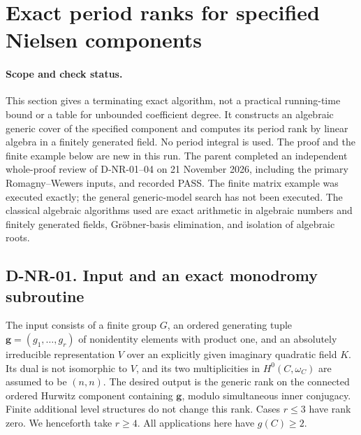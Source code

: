 \section{Exact period ranks for specified Nielsen components}
\label{sec:nielsen-rank-algorithm}

\paragraph{Scope and check status.}
This section gives a terminating exact algorithm, not a practical running-time
bound or a table for unbounded coefficient degree.  It constructs an algebraic
generic cover of the specified component and computes its period rank by
linear algebra in a finitely generated field.  No period integral is used.
The proof and the finite example below are new in this run.  The parent
completed an independent whole-proof review of D-NR-01--04 on
21 November 2026, including the primary Romagny--Wewers inputs, and
recorded PASS.  The finite matrix example was executed exactly; the
general generic-model search has not been executed.  The classical algebraic algorithms used are
exact arithmetic in algebraic numbers and finitely generated fields,
Gr\"obner-basis elimination, and isolation of algebraic roots.

\subsection*{D-NR-01. Input and an exact monodromy subroutine}

The input consists of a finite group $G$, an ordered generating tuple
$\boldsymbol g=(g_1,\ldots,g_r)$ of nonidentity elements with product one,
and an absolutely irreducible representation $V$ over an explicitly given
imaginary quadratic field $K$.  Its dual is not isomorphic to $V$, and its
two multiplicities in $H^0(C,\omega_C)$ are assumed to be $(n,n)$.
The desired output is the generic rank on the connected ordered Hurwitz
component containing $\boldsymbol g$, modulo simultaneous inner conjugacy.
Finite additional level structures do not change this rank.  Cases $r\le3$
have rank zero.  We henceforth take $r\ge4$.  All applications here have
$g(C)\ge2$.

